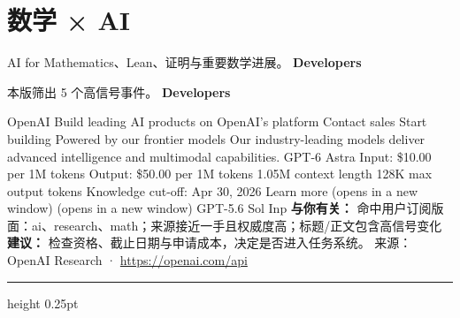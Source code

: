 \documentclass[10.5pt]{ctexart}
\begin{document}
\section*{数学 × AI}
{\color{ormuted} AI for Mathematics、Lean、证明与重要数学进展。}
\vspace{2mm}
{\LARGE\bfseries Developers}\par
\vspace{1mm}
{\color{ormuted} 本版筛出 5 个高信号事件。}
\vspace{3mm}
{\Large\bfseries Developers}\par
OpenAI Build leading AI products on OpenAI’s platform Contact sales Start building Powered by our frontier models Our industry-leading models deliver advanced intelligence and multimodal capabilities. GPT-6 Astra Input: \$10.00 per 1M tokens Output: \$50.00 per 1M tokens 1.05M context length 128K max output tokens Knowledge cut-off: Apr 30, 2026 Learn more (opens in a new window) (opens in a new window) GPT-5.6 Sol Inp
\textbf{与你有关：} 命中用户订阅版面：ai、research、math；来源接近一手且权威度高；标题/正文包含高信号变化
\textbf{建议：} 检查资格、截止日期与申请成本，决定是否进入任务系统。
{\footnotesize\color{ormuted} 来源：OpenAI Research · \url{https://openai.com/api}}
\vspace{4mm}
\hrule height 0.25pt
\vspace{3mm}
\end{document}
